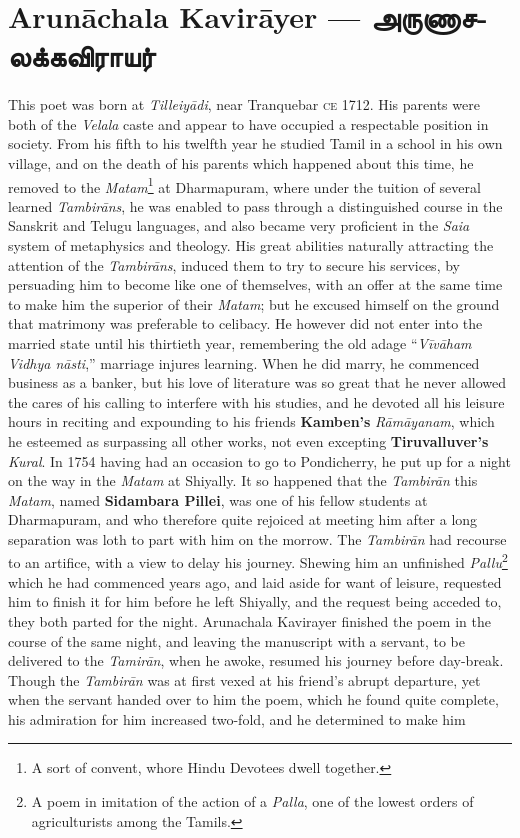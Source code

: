 \documentclass{article}
\newcommand{\TamilBold}[1]{\texttamil{\textbf{#1}}}
\newcommand{\tambold}[1]{\TamilBold{#1}}
\begin{document}
\section{Arun\={a}chala Kavir\={a}yer --- \tambold{அருணாசலக்கவிராயர்}}
\paragraph{}
This poet was born at \emph{Tilleiy\={a}di}, near Tranquebar \textsc{ce} 1712. His parents were both of the \emph{Velala} caste and appear to have occupied a respectable position in society. From his fifth to his twelfth year he studied Tamil in a school in his own village, and on the death of his parents which happened about this time, he removed to the \emph{Matam}\footnote{A sort of convent, whore Hindu Devotees dwell together.} at Dharmapuram, where under the tuition of several learned \emph{Tambir\={a}ns}, he was enabled to pass through a distinguished course in the Sanskrit and Telugu languages, and also became very proficient in the \emph{Saia} system of metaphysics and theology. His great abilities naturally attracting the attention of the \emph{Tambir\={a}ns}, induced them to try to secure his services, by persuading him to become like one of themselves, with an offer at the same time to make him the superior of their \emph{Matam}; but he excused himself on the ground that matrimony was preferable to celibacy. He however did not enter into the married state until his thirtieth year, remembering the old adage ``\emph{V\={i}v\={a}ham Vidhya n\={a}sti},'' marriage injures learning. When he did marry, he commenced business as a banker, but his love of literature was so great that he never allowed the cares of his calling to interfere with his studies, and he devoted all his leisure hours in reciting and expounding to his friends \textbf{Kamben's} \emph{R\={a}m\={a}yanam}, which he esteemed as surpassing all other works, not even excepting \textbf{Tiruvalluver's} \emph{Kural}. In 1754 having had an occasion to go to Pondicherry, he put up for a night on the way in the \emph{Matam} at Shiyally. It so happened that the \emph{Tambir\={a}n} this \emph{Matam}, named \textbf{Sidambara Pillei}, was one of his fellow students at Dharmapuram, and who therefore quite rejoiced at meeting him after a long separation was loth to part with him on the morrow. The \emph{Tambir\={a}n} had recourse to an artifice, with a view to delay his journey. Shewing him an unfinished \emph{Pallu}\footnote{A poem in imitation of the action of a \emph{Palla}, one of the lowest orders of agriculturists among the Tamils.} which he had commenced years ago, and laid aside for want of leisure, requested him to finish it for him before he left Shiyally, and the request being acceded to, they both parted for the night. Arunachala Kavirayer finished the poem in the course of the same night, and leaving the manuscript with a servant, to be delivered to the \emph{Tamir\={a}n}, when he awoke, resumed his journey before day-break. Though the \emph{Tambir\={a}n} was at first vexed at his friend's abrupt departure, yet when the servant handed over to him the poem, which he found quite complete, his admiration for him increased two-fold, and he determined to make him 
\end{document}
